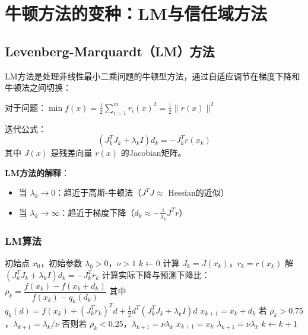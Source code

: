 \section{牛顿方法的变种：LM与信任域方法}\label{sec:lm-trust}

\subsection{Levenberg-Marquardt（LM）方法}\label{sec:lm}

\begin{conceptbox}[LM方法]
LM方法是处理非线性最小二乘问题的牛顿型方法，通过自适应调节在梯度下降和牛顿法之间切换：

对于问题：$\min f(x) = \frac{1}{2}\sum_{i=1}^{m} r_i(x)^2 = \frac{1}{2}\|r(x)\|^2$

迭代公式：
\[
(J_k^T J_k + \lambda_k I) d_k = -J_k^T r(x_k)
\]
其中 $J(x)$ 是残差向量 $r(x)$ 的Jacobian矩阵。
\end{conceptbox}

\textbf{LM方法的解释}：
\begin{itemize}
    \item 当 $\lambda_k \to 0$：趋近于高斯-牛顿法（$J^T J \approx$ Hessian的近似）
    \item 当 $\lambda_k \to \infty$：趋近于梯度下降（$d_k \approx -\frac{1}{\lambda_k} J^T r$）
\end{itemize}

\subsubsection{LM算法}

\begin{algorithm}[H]
\caption{Levenberg-Marquardt方法}
\begin{algorithmic}[1]
\Require 初始点 $x_0$，初始参数 $\lambda_0 > 0$，$\nu > 1$
\State $k \gets 0$
    \State 计算 $J_k = J(x_k)$，$r_k = r(x_k)$
    \State 解 $(J_k^T J_k + \lambda_k I) d_k = -J_k^T r_k$
    \State 计算实际下降与预测下降比：
    \State $\rho_k = \dfrac{f(x_k) - f(x_k + d_k)}{f(x_k) - q_k(d_k)}$
    \State 其中 $q_k(d) = f(x_k) + (J_k^T r_k)^T d + \frac{1}{2}d^T(J_k^T J_k + \lambda_k I)d$
        \State $x_{k+1} = x_k + d_k$
        \State 若 $\rho_k > 0.75$，$\lambda_{k+1} = \lambda_k / \nu$
        \State 否则若 $\rho_k < 0.25$，$\lambda_{k+1} = \nu \lambda_k$
    \Else
        \State $x_{k+1} = x_k$
        \State $\lambda_{k+1} = \nu \lambda_k$
    \EndIf
    \State $k \gets k + 1$
\EndWhile
\end{algorithmic}
\end{algorithm}

